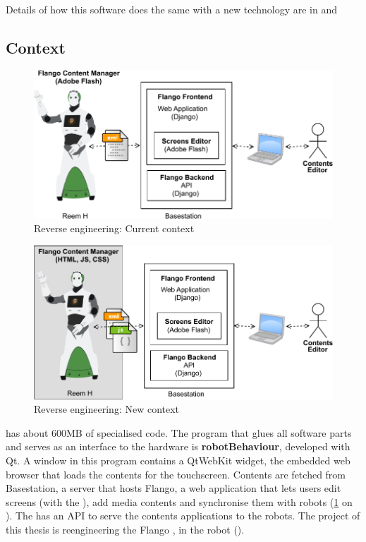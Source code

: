 Details of how this software does the same with a new technology are in  and 

\subsection{Context}
\label{sec:context}

\begin{figure}[htb]
    \centering
    \includegraphics{figures/context-original.pdf}
    \caption{Reverse engineering: Current context}
    \label{fig:context-original}
\end{figure}

\begin{figure}[htb]
    \centering
    \includegraphics{figures/context-new.pdf}
    \caption{Reverse engineering: New context}
    \label{fig:context-new}
\end{figure}

 has about 600MB of specialised code.
The program that glues all software parts and serves as an interface to the hardware is \textbf{robotBehaviour}, developed with Qt.
A window in this program contains a QtWebKit widget, the embedded web browser that loads the contents for the touchscreen.
Contents are fetched from Basestation, a server that hosts Flango, a web application that lets users edit screens (with the \se), add media contents and synchronise them with robots (\ref{fig:context-original} on \pageref{fig:context-original}).
The \flangobe has an \ac{API} to serve the contents applications to the robots.
The project of this thesis is reengineering the Flango \cm , in the robot ().

